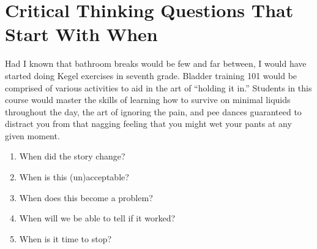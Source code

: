 \documentclass[10]{article}
\begin{document}
\section{Critical Thinking Questions That Start With When}
Had I known that bathroom breaks would be few and far between, I would have started doing Kegel exercises in seventh grade. Bladder training 101 would be comprised of various activities to aid in the art of “holding it in.” Students in this course would master the skills of learning how to survive on minimal liquids throughout the day, the art of ignoring the pain, and pee dances guaranteed to distract you from that nagging feeling that you might wet your pants at any given moment.
\begin{enumerate}
    \item When did the story change?
\item    When is this (un)acceptable?
    \item When does this become a problem? 
    \item When will we be able to tell if it worked?
\item    When is it time to stop?
    
\end{enumerate}





 
\end{document}
